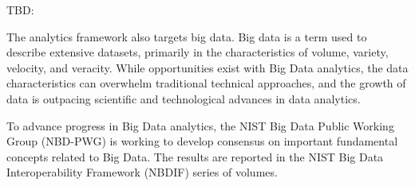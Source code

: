 TBD:

The
analytics framework also targets big data.
Big data is a term used to
describe extensive datasets, primarily in the characteristics of
volume, variety, velocity, and veracity. While opportunities exist
with Big Data analytics, the data characteristics can overwhelm
traditional technical approaches, and the growth of data is outpacing
scientific and technological advances in data analytics.

To advance
progress in Big Data analytics, the NIST Big Data Public Working Group
(NBD-PWG) is working to develop consensus on important fundamental
concepts related to Big Data. The results are reported in the NIST Big
Data Interoperability Framework (NBDIF) series of volumes.


